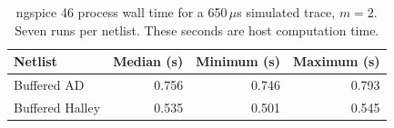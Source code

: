 \begin{table}[htbp]\centering\small
\caption{ngspice 46 process wall time for a 650\,$\mu$s simulated trace, $m=2$. Seven runs per netlist. These seconds are host computation time.}\label{tab:spicetime}
\begin{tabular}{@{}lrrr@{}}\toprule
Netlist & Median (s) & Minimum (s) & Maximum (s)\\\midrule
Buffered AD & 0.756 & 0.746 & 0.793\\
Buffered Halley & 0.535 & 0.501 & 0.545\\
\bottomrule\end{tabular}\end{table}

